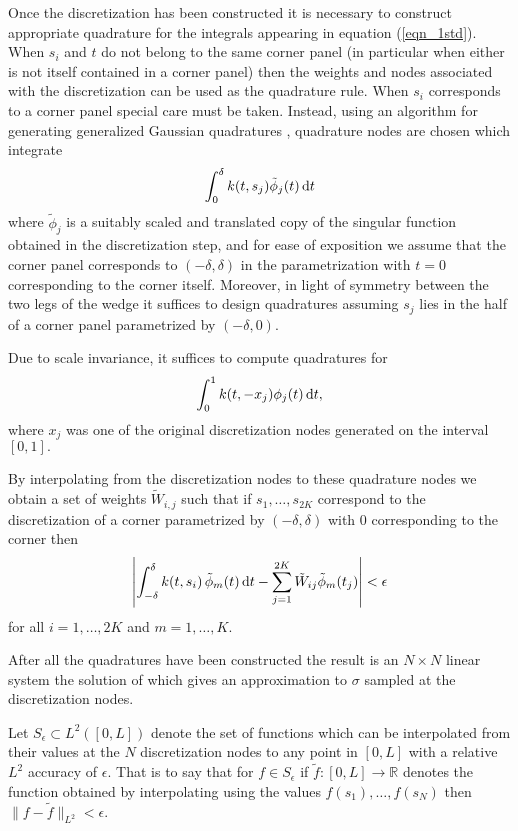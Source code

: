 Once the discretization has been constructed it is necessary to construct appropriate quadrature for the integrals appearing in equation (\ref{eqn_1std}). When $s_i$ and $t$ do not belong to the same corner panel (in particular when either is not itself contained in a corner panel) then the weights and nodes associated with the discretization can be used as the quadrature rule. When $s_i$ corresponds to a corner panel special care must be taken. Instead, using an algorithm for generating generalized Gaussian quadratures \cite{}, quadrature nodes are chosen which integrate
\begin{align}
\int_{0}^\delta k(t,s_j) \tilde{\phi}_j(t)\,{\rm d}t
\end{align} 
where $\tilde{\phi}_j$ is a suitably scaled and translated copy of the singular function obtained in the discretization step, and for ease of exposition we assume that the corner panel corresponds to $(-\delta,\delta)$ in the parametrization with $t=0$ corresponding to the corner itself. Moreover, in light of symmetry between the two legs of the wedge it suffices to design quadratures assuming  $s_j$ lies in the half of a corner panel parametrized by $(-\delta,0).$
\begin{remark1}
Due to scale invariance, it suffices to compute quadratures for 
\begin{align}
\int_{0}^1 k(t,-x_j) {\phi}_j(t)\,{\rm d}t,
\end{align} 
where $x_j$ was one of the original discretization nodes generated on the interval $[0,1].$
\end{remark1}
\begin{remark1}
By interpolating from the discretization nodes to these quadrature nodes we obtain a set of weights $\tilde{W}_{i,j}$ such that if $s_1,\dots,s_{2K}$ correspond to the discretization of a corner parametrized by $(-\delta,\delta)$ with $0$ corresponding to the corner then
\begin{align}
\left| \int_{-\delta}^\delta k(t,s_i) \, \tilde{\phi}_m(t)\,{\rm d}t - \sum_{j=1}^{2K} \tilde{W}_{ij} \tilde{\phi}_{m}(t_j) \right| < \epsilon
\end{align}
for all $i=1,\dots,2K$ and $m=1,\dots,K.$
\end{remark1}

After all the quadratures have been constructed the result is an $N \times N$ linear system the solution of which gives an approximation to $\sigma$ sampled at the discretization nodes. 

\begin{definition}\label{def:seps}
Let $S_\epsilon \subset L^2([0,L])$ denote the set of functions which can be interpolated from their values at the $N$ discretization nodes to any point in $[0,L]$ with a relative $L^2$ accuracy of $\epsilon.$ That is to say that for $f \in S_\epsilon$ if $\tilde{f}:[0,L] \to \mathbb{R}$ denotes the function obtained by interpolating using the values $f(s_1),\dots,f(s_N)$ then $\|f -\tilde{f}\|_{L^2} < \epsilon.$ 
\end{definition}

